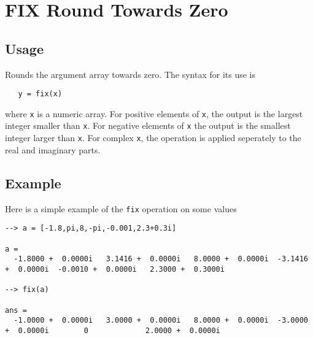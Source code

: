 \section{FIX Round Towards Zero}

\subsection{Usage}

Rounds the argument array towards zero.  The syntax for its use is
\begin{verbatim}
   y = fix(x)
\end{verbatim}
where \verb|x| is a numeric array.  For positive elements of \verb|x|, the output
is the largest integer smaller than \verb|x|.  For negative elements of \verb|x|
the output is the smallest integer larger than \verb|x|.  For complex \verb|x|,
the operation is applied seperately to the real and imaginary parts.
\subsection{Example}

Here is a simple example of the \verb|fix| operation on some values
\begin{verbatim}
--> a = [-1.8,pi,8,-pi,-0.001,2.3+0.3i]

a = 
  -1.8000 +  0.0000i   3.1416 +  0.0000i   8.0000 +  0.0000i  -3.1416 +  0.0000i  -0.0010 +  0.0000i   2.3000 +  0.3000i 

--> fix(a)

ans = 
  -1.0000 +  0.0000i   3.0000 +  0.0000i   8.0000 +  0.0000i  -3.0000 +  0.0000i        0             2.0000 +  0.0000i 
\end{verbatim}
